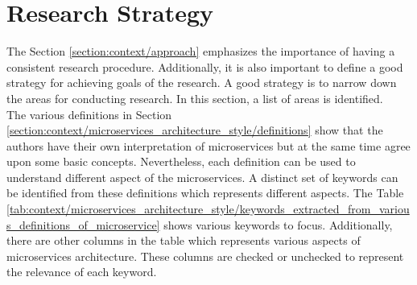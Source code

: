\section{Research Strategy}\label{section:context/research_strategy}
The Section \ref{section:context/approach} emphasizes the importance of having a consistent research procedure. Additionally, it is also important to define a good strategy for achieving goals of the research. A good strategy is to narrow down the areas for conducting research. In this section, a list of areas is identified.\\
The various definitions in Section \ref{section:context/microservices_architecture_style/definitions} show that the authors have their own interpretation of microservices but at the same time agree upon some basic concepts. Nevertheless, each definition can be used to understand different aspect of the microservices. A distinct set of keywords can be identified from these definitions which represents different aspects. The Table \ref{tab:context/microservices_architecture_style/keywords_extracted_from_various_definitions_of_microservice} shows various keywords to focus. Additionally, there are other columns in the table which represents various aspects of microservices architecture. These columns are checked or unchecked to represent the relevance of each keyword. 

